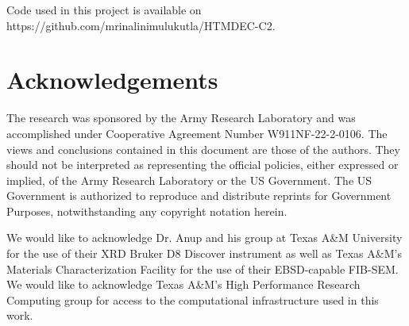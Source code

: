 \documentclass[letterpaper,4pt,times,preprint]{elsarticle}
\begin{document}
    Code used in this project is available on https://github.com/mrinalinimulukutla/HTMDEC-C2.

\section{Acknowledgements}

The research was sponsored by the Army Research Laboratory and was accomplished under Cooperative Agreement Number W911NF-22-2-0106. The views and conclusions contained in this document are those of the authors. They should not be interpreted as representing the official policies, either expressed or implied, of the Army Research Laboratory or the US Government. The US Government is authorized to reproduce and distribute reprints for Government Purposes, notwithstanding any copyright notation herein. 
    
We would like to acknowledge Dr. Anup and his group at Texas A\&M University for the use of their XRD Bruker D8 Discover instrument as well as Texas A\&M’s Materials Characterization Facility for the use of their EBSD-capable FIB-SEM. We would like to acknowledge Texas A\&M’s High Performance Research Computing group for access to the computational infrastructure used in this work.




\end{document}
